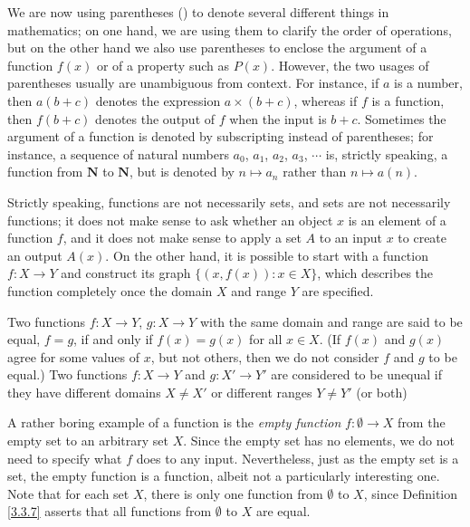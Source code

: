 \setcounter{theorem}{4}
\begin{remark}\label{3.3.5}
We are now using parentheses () to denote several different things in mathematics;
on one hand, we are using them to clarify the order of operations, but on the other hand we also use parentheses to enclose the argument of a function \(f(x)\) or of a property such as \(P(x)\).
However, the two usages of parentheses usually are unambiguous from context.
For instance, if \(a\) is a number, then \(a(b + c)\) denotes the expression \(a \times (b + c)\), whereas if \(f\) is a function, then \(f(b + c)\) denotes the output of \(f\) when the input is \(b + c\).
Sometimes the argument of a function is denoted by subscripting instead of parentheses;
for instance, a sequence of natural numbers \(a_0\), \(a_1\), \(a_2\), \(a_3\), \(\cdots\) is, strictly speaking, a function from \(\mathbf{N}\) to \(\mathbf{N}\), but is denoted by \(n \mapsto a_n\) rather than \(n \mapsto a(n)\).
\end{remark}

\begin{remark}\label{3.3.6}
Strictly speaking, functions are not necessarily sets, and sets are not necessarily functions;
it does not make sense to ask whether an object \(x\) is an element of a function \(f\), and it does not make sense to apply a set \(A\) to an input \(x\) to create an output \(A(x)\).
On the other hand, it is possible to start with a function \(f : X \to Y\) and construct its graph \(\{(x, f(x)) : x \in X\}\), which describes the function completely once the domain \(X\) and range \(Y\) are specified.
\end{remark}

\begin{definition}\label{3.3.7}
Two functions \(f : X \to Y\), \(g : X \to Y\) with the same domain and range are said to be equal, \(f = g\), if and only if \(f(x) = g(x)\) for all \(x \in X\).
(If \(f(x)\) and \(g(x)\) agree for some values of \(x\), but not others, then we do not consider \(f\) and \(g\) to be equal.)
Two functions \(f : X \to Y\) and \(g : X' \to Y'\) are considered to be unequal if they have different domains \(X \neq X'\) or different ranges \(Y \neq Y'\) (or both)
\end{definition}

\begin{note}
A rather boring example of a function is the \emph{empty function} \(f : \emptyset \to X\) from the empty set to an arbitrary set \(X\).
Since the empty set has no elements, we do not need to specify what \(f\) does to any input.
Nevertheless, just as the empty set is a set, the empty function is a function, albeit not a particularly interesting one.
Note that for each set \(X\), there is only one function from \(\emptyset\) to \(X\), since Definition \ref{3.3.7} asserts that all functions from \(\emptyset\) to \(X\) are equal.
\end{note}

